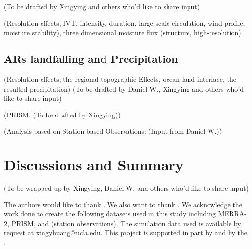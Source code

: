 \documentclass[draft,ms]{agutex}   %
\begin{document}
\begin{article}
{\color{red}(To be drafted by Xingying and others who'd like to share input)}

(Resolution effects, IVT, intensity, duration, large-scale circulation, wind profile, moisture stability), three dimensional moisture flux (structure, high-resolution)

\subsection{ARs landfalling and Precipitation}

(Resolution effects, the regional topographic Effects, ocean-land interface, the resulted precipitation) {\color{red}(To be drafted by Daniel W., Xingying and others who'd like to share input)}

(PRISM: {\color{red}(To be drafted by Xingying)})

(Analysis based on Station-based Observations: {\color{red}(Input from Daniel W.)})



\section{Discussions and Summary}

{\color{red}(To be wrapped up by Xingying, Daniel W. and others who'd like to share input)}


\begin{acknowledgments}

The authors would like to thank . We also want to thank . We acknowledge the work done to create the following datasets used in this study including MERRA-2, PRISM, and (station observations). The simulation data used is available by request at xingyhuang@ucla.edu. This project is supported in part by and by the .

\end{acknowledgments}





\end{article}


\clearpage



\clearpage



\end{document}
